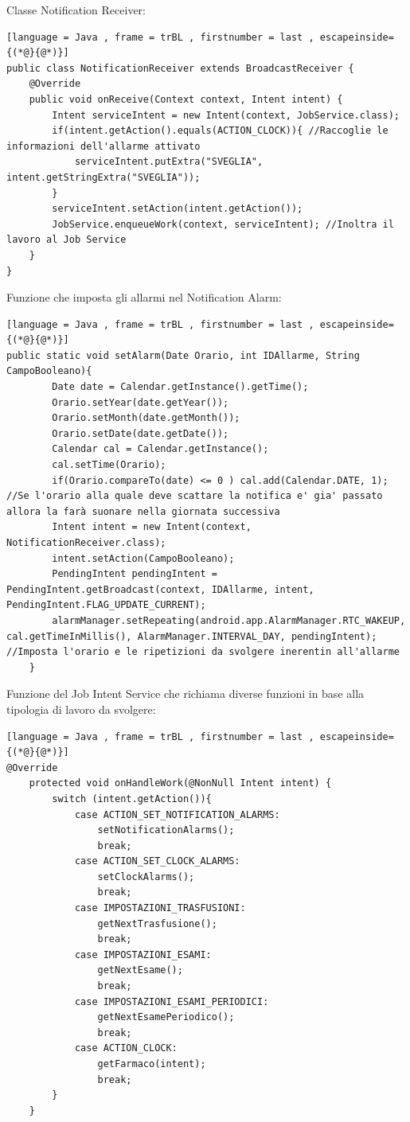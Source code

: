 \documentclass[12pt,a4paper,openright,twoside]{report}
\begin{document}
Classe Notification Receiver:
\begin{lstlisting}[language = Java , frame = trBL , firstnumber = last , escapeinside={(*@}{@*)}]
public class NotificationReceiver extends BroadcastReceiver {
    @Override
    public void onReceive(Context context, Intent intent) {
        Intent serviceIntent = new Intent(context, JobService.class);
        if(intent.getAction().equals(ACTION_CLOCK)){ //Raccoglie le informazioni dell'allarme attivato
            serviceIntent.putExtra("SVEGLIA", intent.getStringExtra("SVEGLIA"));
        }
        serviceIntent.setAction(intent.getAction());
        JobService.enqueueWork(context, serviceIntent); //Inoltra il lavoro al Job Service
    }
}
\end{lstlisting}

Funzione che imposta gli allarmi nel Notification Alarm:
\begin{lstlisting}[language = Java , frame = trBL , firstnumber = last , escapeinside={(*@}{@*)}]
public static void setAlarm(Date Orario, int IDAllarme, String CampoBooleano){
        Date date = Calendar.getInstance().getTime();
        Orario.setYear(date.getYear());
        Orario.setMonth(date.getMonth());
        Orario.setDate(date.getDate());
        Calendar cal = Calendar.getInstance();
        cal.setTime(Orario);
        if(Orario.compareTo(date) <= 0 ) cal.add(Calendar.DATE, 1); //Se l'orario alla quale deve scattare la notifica e' gia' passato allora la farà suonare nella giornata successiva
        Intent intent = new Intent(context, NotificationReceiver.class);
        intent.setAction(CampoBooleano);
        PendingIntent pendingIntent = PendingIntent.getBroadcast(context, IDAllarme, intent, PendingIntent.FLAG_UPDATE_CURRENT);
        alarmManager.setRepeating(android.app.AlarmManager.RTC_WAKEUP, cal.getTimeInMillis(), AlarmManager.INTERVAL_DAY, pendingIntent); //Imposta l'orario e le ripetizioni da svolgere inerentin all'allarme
    }
\end{lstlisting}

Funzione del Job Intent Service che richiama diverse funzioni in base alla tipologia di lavoro da svolgere:
\begin{lstlisting}[language = Java , frame = trBL , firstnumber = last , escapeinside={(*@}{@*)}]
@Override
    protected void onHandleWork(@NonNull Intent intent) {
        switch (intent.getAction()){
            case ACTION_SET_NOTIFICATION_ALARMS:
                setNotificationAlarms();
                break;
            case ACTION_SET_CLOCK_ALARMS:
                setClockAlarms();
                break;
            case IMPOSTAZIONI_TRASFUSIONI:
                getNextTrasfusione();
                break;
            case IMPOSTAZIONI_ESAMI:
                getNextEsame();
                break;
            case IMPOSTAZIONI_ESAMI_PERIODICI:
                getNextEsamePeriodico();
                break;
            case ACTION_CLOCK:
                getFarmaco(intent);
                break;
        }
    }
\end{lstlisting}
\end{document}
